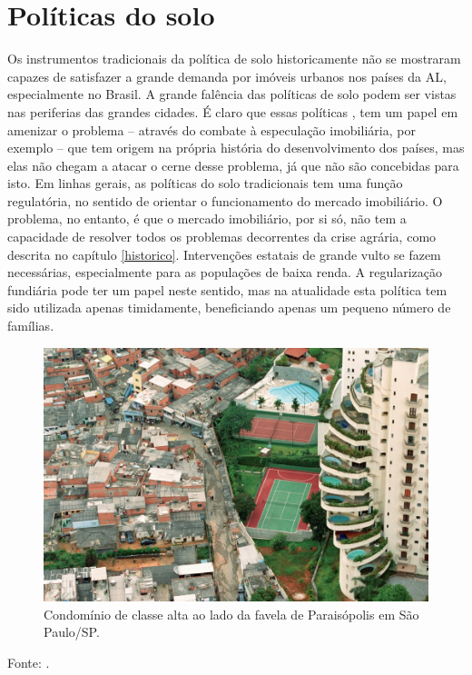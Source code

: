 \documentclass[
	12pt,				%
	oneside,			%
	a4paper,			%
	chapter=TITLE,		%
	section=TITLE,		%
	english,			%
	brazil				%
	]{abntex2}
\newcommand{\bcenter}{\begin{center}}
\newcommand{\ecenter}{\end{center}}
\begin{document}
\hypertarget{politicas}{%
\chapter{Políticas do solo}\label{politicas}}

Os instrumentos tradicionais da política de solo historicamente não se mostraram
capazes de satisfazer a grande demanda por imóveis urbanos nos países da \gls{AL},
especialmente no Brasil. A grande falência das políticas de solo podem ser
vistas nas periferias das grandes cidades. É claro que essas políticas \autocite{suelo},
tem um papel em amenizar o problema -- através do combate à especulação
imobiliária, por exemplo -- que tem origem na própria história do
desenvolvimento dos países, mas elas não chegam a atacar o cerne desse problema,
já que não são concebidas para isto. Em linhas gerais, as políticas do solo
tradicionais tem uma função regulatória, no sentido de orientar o funcionamento
do mercado imobiliário. O problema, no entanto, é que o mercado imobiliário,
por si só, não tem a capacidade de resolver todos os problemas decorrentes da
crise agrária, como descrita no capítulo \ref{historico}. Intervenções estatais
de grande vulto se fazem necessárias, especialmente para as populações de baixa
renda. A regularização fundiária pode ter um papel neste sentido, mas na
atualidade esta política tem sido utilizada apenas timidamente, beneficiando
apenas um pequeno número de famílias.
\begin{figure}[H]

{\centering \includegraphics[width=0.7\linewidth]{images/injustica_SP} 

}

\caption{Condomínio de classe alta ao lado da favela de Paraisópolis em São Paulo/SP.}\label{fig:injustica}
\end{figure}
\bcenter

Fonte: \textcite{paraisopolis}.
\ecenter
\end{document}
